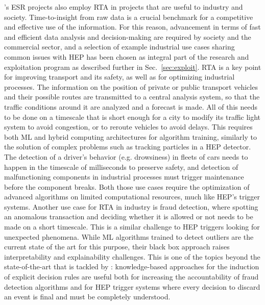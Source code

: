 \acronym's ESR projects also employ RTA in projects that are useful to industry and society. 
Time-to-insight from raw data is a crucial benchmark for a competitive and effective use of the information. For this reason, advancement in terms of fast and efficient data analysis and decision-making are required by society and the commercial sector, and a selection of example industrial use cases sharing common issues with HEP has been chosen as integral part of the \acronym research and exploitation program as described further in Sec.~\ref{sec:exploit}.  
RTA is a key point for improving transport and its safety, as well as for optimizing industrial processes. 
The information on the position of private or public transport vehicles and their possible routes are transmitted to a central analysis system, so that the traffic conditions around it are analyzed and a forecast is made. 
All of this needs to be done on a timescale that is short enough for a city to modify its traffic light system to avoid congestion, or to reroute vehicles to avoid delays. 
This requires both ML and hybrid computing architectures for algorithm training, similarly to the solution of complex problems such as tracking particles in a HEP detector. 
The detection of a driver's behavior (e.g. drowsiness) in fleets of cars needs to happen in the timescale of milliseconds to preserve safety, and detection of malfunctioning components in industrial processes must trigger maintenance before the component breaks. Both those use cases require the optimization of advanced algorithms on limited computational resources, much like HEP's trigger systems.
Another use case for RTA in industry is fraud detection, where spotting an anomalous transaction and deciding whether it is allowed or not needs to be made on a short timescale. This is a similar challenge to HEP triggers looking for unexpected phenomena. 
While ML algorithms trained to detect outliers are the current state of the art for this purpose, their black box approach raises interpretability and explainability challenges. 
This is one of the topics beyond the state-of-the-art that is tackled by \acronym: knowledge-based approaches for the induction of explicit decision rules are useful both for increasing the accountability of fraud detection algorithms and for HEP trigger systems where every decision to discard an event is final and must be completely understood.\\ 

